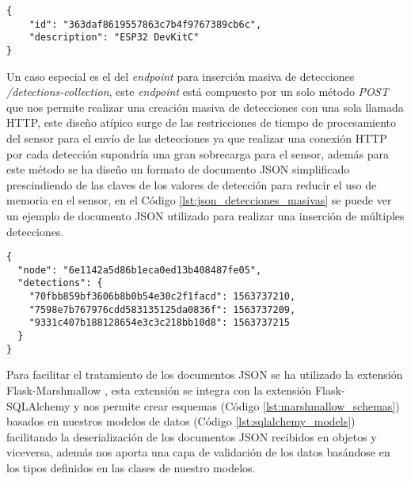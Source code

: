 \documentclass[../proyecto.tex]{subfiles}
\begin{document}
{{{\medskip

\begin{minipage}{\linewidth}
\begin{lstlisting}[caption=Ejemplo de JSON para sensores, label={lst:json_sensor}, captionpos=b, frame=single]
{
    "id": "363daf8619557863c7b4f9767389cb6c",
    "description": "ESP32 DevKitC"
}
\end{lstlisting}
\end{minipage}

\medskip

Un caso especial es el del \textit{endpoint} para inserción masiva de detecciones \textit{/detections-collection}, este \textit{endpoint} está compuesto por un solo método \textit{POST} que nos permite realizar una creación masiva de detecciones con una sola llamada HTTP, este diseño atípico surge de las restricciones de tiempo de procesamiento del sensor para el envío de las detecciones ya que realizar una conexión HTTP por cada detección supondría una gran sobrecarga para el sensor, además para este método se ha diseño un formato de documento JSON simplificado prescindiendo de las claves de los valores de detección para reducir el uso de memoria en el sensor, en el Código \ref{lst:json_detecciones_masivas} se puede ver un ejemplo de documento JSON utilizado para realizar una inserción de múltiples detecciones.\\

\medskip

\begin{minipage}{\linewidth}
\begin{lstlisting}[caption=Ejemplo de JSON para inserción masiva de detecciones, label={lst:json_detecciones_masivas},captionpos=b, frame=single]
{
  "node": "6e1142a5d86b1eca0ed13b408487fe05",
  "detections": {
    "70fbb859bf3606b8b0b54e30c2f1facd": 1563737210,
    "7598e7b767976cdd583135125da0836f": 1563737209,
    "9331c407b188128654e3c3c218bb10d8": 1563737215
  }
}
\end{lstlisting}
\end{minipage}

\medskip

Para facilitar el tratamiento de los documentos JSON se ha utilizado la extensión Flask-Marshmallow \cite{flask_marshmallow}, esta extensión se integra con la extensión Flask-SQLAlchemy y nos permite crear esquemas (Código \ref{lst:marshmallow_schemas}) basados en nuestros modelos de datos  (Código \ref{lst:sqlalchemy_models}) facilitando la deserialización de los documentos JSON recibidos en objetos y viceversa, además nos aporta una capa de validación de los datos basándose en los tipos definidos en las clases de nuestro modelos.\\

}}}
\end{document}
